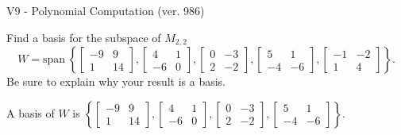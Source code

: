 \begin{exercise}
  \begin{exerciseTitle}V9 - Polynomial Computation (ver. 986)\end{exerciseTitle}
  \begin{exerciseStatement}
    Find a basis for the subspace of \(M_{2,2}\) 
\[W=\mathrm{span}\ \left\{\left[\begin{array}{cc}
-9 & 9 \\
1 & 14
\end{array}\right] , \left[\begin{array}{cc}
4 & 1 \\
-6 & 0
\end{array}\right] , \left[\begin{array}{cc}
0 & -3 \\
2 & -2
\end{array}\right] , \left[\begin{array}{cc}
5 & 1 \\
-4 & -6
\end{array}\right] , \left[\begin{array}{cc}
-1 & -2 \\
1 & 4
\end{array}\right]\right\}.\]
 Be sure to explain why your result is a basis.


  \end{exerciseStatement}
  \begin{exerciseAnswer}
   A basis of \(W\) is  \(\left\{\left[\begin{array}{cc}
-9 & 9 \\
1 & 14
\end{array}\right] , \left[\begin{array}{cc}
4 & 1 \\
-6 & 0
\end{array}\right] , \left[\begin{array}{cc}
0 & -3 \\
2 & -2
\end{array}\right] , \left[\begin{array}{cc}
5 & 1 \\
-4 & -6
\end{array}\right]\right\}\).
  


  \end{exerciseAnswer}
\end{exercise}